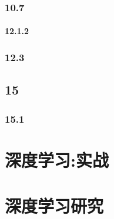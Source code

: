 \documentclass[a4paper,11pt]{book}
\begin{document}
\section{10.7}
\label{sec:10.7}

\subsection{12.1.2}
\label{sec:12.1.2}

\section{12.3}
\label{sec:12.3}


\chapter{15}
\label{chap:15}

\section{15.1}
\label{sec:15.1}








\part{深度学习:实战}
\label{part:2}

\part{深度学习研究}
\label{part:3}
\end{document}
